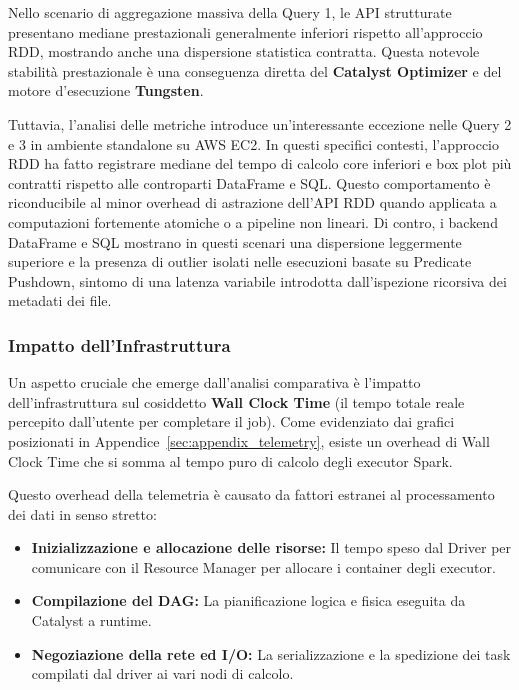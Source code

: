 \documentclass[conference]{IEEEtran}
\begin{document}
Nello scenario di aggregazione massiva della Query 1, le API strutturate presentano mediane prestazionali generalmente inferiori rispetto all'approccio RDD, mostrando anche una dispersione statistica contratta.
Questa notevole stabilità prestazionale è una conseguenza diretta del \textbf{Catalyst Optimizer} e del motore d'esecuzione \textbf{Tungsten}.

Tuttavia, l'analisi delle metriche introduce un'interessante eccezione nelle Query 2 e 3 in ambiente standalone su AWS EC2. In questi specifici contesti, l'approccio RDD ha fatto registrare mediane del tempo di calcolo core inferiori e box plot più contratti rispetto alle controparti DataFrame e SQL. Questo comportamento è riconducibile al minor overhead di astrazione dell'API RDD quando applicata a computazioni fortemente atomiche o a pipeline non lineari.
Di contro, i backend DataFrame e SQL mostrano in questi scenari una dispersione leggermente superiore e la presenza di outlier isolati nelle esecuzioni basate su Predicate Pushdown, sintomo di una latenza variabile introdotta dall'ispezione ricorsiva dei metadati dei file.

\subsubsection{Impatto dell'Infrastruttura}
Un aspetto cruciale che emerge dall'analisi comparativa è l'impatto dell'infrastruttura sul cosiddetto \textbf{Wall Clock Time} (il tempo totale reale percepito dall'utente per completare il job).
Come evidenziato dai grafici posizionati in Appendice~\ref{sec:appendix_telemetry}, esiste un overhead di Wall Clock Time che si somma al tempo puro di calcolo degli executor Spark.

Questo overhead della telemetria è causato da fattori estranei al processamento dei dati in senso stretto:
\begin{itemize}
    \item \textbf{Inizializzazione e allocazione delle risorse:} Il tempo speso dal Driver per comunicare con il Resource Manager per allocare i container degli executor.
    \item \textbf{Compilazione del DAG:} La pianificazione logica e fisica eseguita da Catalyst a runtime.
    \item \textbf{Negoziazione della rete ed I/O:} La serializzazione e la spedizione dei task compilati dal driver ai vari nodi di calcolo.
\end{itemize}
\end{document}
